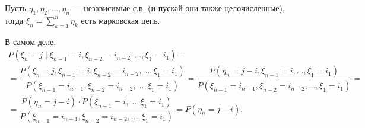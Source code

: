 \begin{ex}
  Пусть $\eta_1, \eta_2, \dots, \eta_n$ --- независимые с.в. (и пускай они также целочисленные),
  тогда $\xi_n = \sum\limits_{k=1}^n \eta_k$ есть марковская цепь.

  В самом деле,
  \begin{multline*}
    P(\xi_n = j \mid \xi_{n-1} = i, \xi_{n-2} = i_{n-2}, \dots, \xi_1 = i_1)
    =\\=
    \dfrac{P(\xi_n = j, \xi_{n-1} = i, \xi_{n-2} = i_{n-2}, \dots, \xi_1 = i_1)}{P(\xi_{n-1} = i_{n-1}, \xi_{n-2} = i_{n-2}, \dots, \xi_1 = i_1)}
    = \dfrac{P(\eta_n = j-i, \xi_{n-1}=i, \dots, \xi_1 = i_1 )}{P(\xi_{n-1} = i_{n-1}, \xi_{n-2} = i_{n-2}, \dots, \xi_1 = i_1)}
    =\\= \dfrac{P(\eta_n = j-i) \cdot P(\xi_{n-1}=i, \dots, \xi_1 = i_1 )}{P(\xi_{n-1} = i_{n-1}, \xi_{n-2} = i_{n-2}, \dots, \xi_1 = i_1)}
    = P(\eta_n = j-i).
  \end{multline*}
\end{ex}


